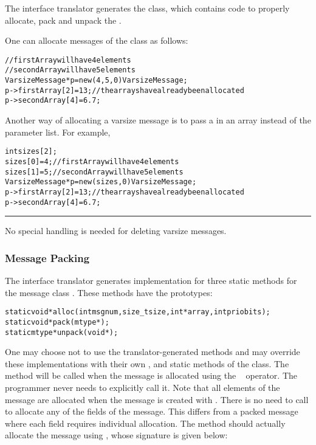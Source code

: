 The interface translator generates the  class,
which contains code to properly allocate, pack and unpack the
.


One can allocate messages of the  class as follows:

\begin{alltt}
// firstArray will have 4 elements
// secondArray will have 5 elements 
VarsizeMessage* p = new(4, 5, 0) VarsizeMessage;
p->firstArray[2] = 13;     // the arrays have already been allocated 
p->secondArray[4] = 6.7; 
\end{alltt}

Another way of allocating a varsize message is to pass a  in an array
instead of the parameter list. For example,

\begin{alltt}
int sizes[2];
sizes[0] = 4;               // firstArray will have 4 elements
sizes[1] = 5;               // secondArray will have 5 elements 
VarsizeMessage* p = new(sizes, 0) VarsizeMessage;
p->firstArray[2] = 13;     // the arrays have already been allocated 
p->secondArray[4] = 6.7; 
\end{alltt}

\hrule
\normalsize

No special handling is needed for deleting varsize messages.

\subsubsection{Message Packing}

\label{message packing}

The \charmpp{} interface translator generates implementation for three static
methods for the message class . These methods have the
prototypes:

\begin{alltt}
    static void* alloc(int msgnum, size_t size, int* array, int priobits);
    static void* pack(mtype*);
    static mtype* unpack(void*);
\end{alltt}

One may choose not to use the translator-generated methods and may override
these implementations with their own ,  and 
static methods of the  class.  The  method will be called
when the message is allocated using the \CC\  operator. The programmer
never needs to explicitly call it.  Note that all elements of the message are
allocated when the message is created with . There is no need to call
 to allocate any of the fields of the message. This differs from a
packed message where each field requires individual allocation. The 
method should actually allocate the message using , whose
signature is given below:


